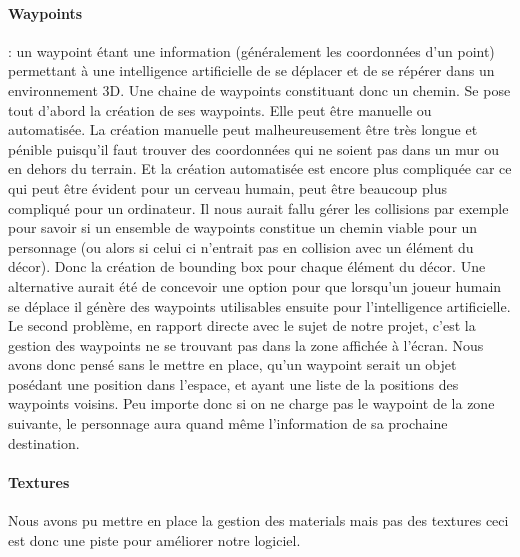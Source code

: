 \documentclass{report}
\begin{document}
\paragraph{Waypoints} : un waypoint étant une information (généralement les coordonnées d'un point) permettant à une intelligence artificielle de se déplacer et de se répérer dans un environnement 3D. Une chaine de waypoints constituant donc un chemin. Se pose tout d'abord la création de ses waypoints. Elle peut être manuelle ou automatisée. La création manuelle peut malheureusement être très longue et pénible puisqu'il faut trouver des coordonnées qui ne soient pas dans un mur ou en dehors du terrain. Et la création automatisée est encore plus compliquée car ce qui peut être évident pour un cerveau humain, peut être beaucoup plus compliqué pour un ordinateur. Il nous aurait fallu gérer les collisions par exemple pour savoir si un ensemble de waypoints constitue un chemin viable pour un personnage (ou alors si celui ci n'entrait pas en collision avec un élément du décor). Donc la création de bounding box pour chaque élément du décor. Une alternative aurait été de concevoir une option pour que lorsqu'un joueur humain se déplace il génère des waypoints utilisables ensuite pour l'intelligence artificielle.  
Le second problème, en rapport directe avec le sujet de notre projet, c'est la gestion des waypoints ne se trouvant pas dans la zone affichée à l'écran. Nous avons donc pensé sans le mettre en place, qu'un waypoint serait un objet posédant une position dans l'espace, et ayant une liste de la positions des  waypoints voisins. Peu importe donc si on ne charge pas le waypoint de la zone suivante, le personnage aura quand même l'information de sa prochaine destination. 

\paragraph{Textures}  Nous avons pu mettre en place la gestion des materials mais pas des textures ceci est donc une piste pour améliorer notre logiciel.


	
	
\end{document}

